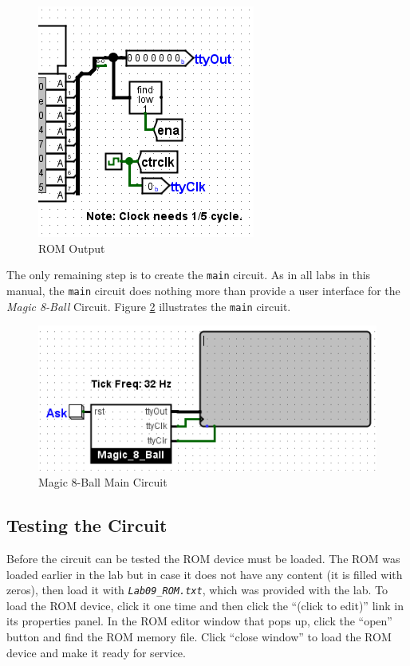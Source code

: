 \begin{figure}[H]
	\centering
	\includegraphics[width=\maxwidth{.95\linewidth}]{gfx/09-09}
	\caption{ROM Output}
	\label{fig:09-09}
\end{figure}

The only remaining step is to create the \lstinline[columns=fixed]|main| circuit. As in all labs in this manual, the \lstinline[columns=fixed]|main| circuit does nothing more than provide a user interface for the \textit{Magic 8-Ball} Circuit. Figure \ref{fig:09-10} illustrates the \lstinline[columns=fixed]|main| circuit.

\begin{figure}[H]
	\centering
	\includegraphics[width=\maxwidth{.95\linewidth}]{gfx/09-10}
	\caption{Magic 8-Ball Main Circuit}
	\label{fig:09-10}
\end{figure}

\subsection{Testing the Circuit}

Before the circuit can be tested the ROM device must be loaded. The ROM was loaded earlier in the lab but in case it does not have any content (it is filled with zeros), then load it with \emph{\texttt{Lab09\_ROM.txt}}, which was provided with the lab. To load the ROM device, click it one time and then click the ``(click to edit)'' link in its properties panel. In the ROM editor window that pops up, click the ``open'' button and find the ROM memory file. Click ``close window'' to load the ROM device and make it ready for service.

